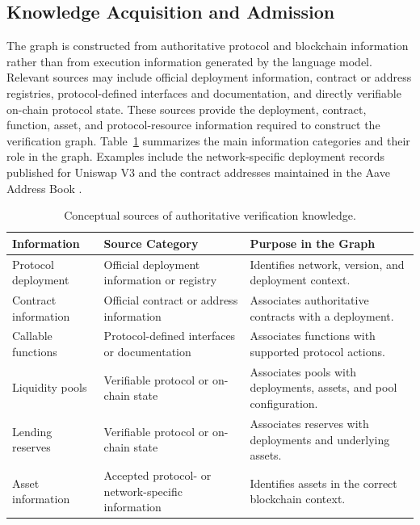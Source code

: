 \subsection{Knowledge Acquisition and Admission}

The graph is constructed from authoritative protocol and blockchain information
rather than from execution information generated by the language model.
Relevant sources may include official deployment information, contract or
address registries, protocol-defined interfaces and documentation, and directly
verifiable on-chain protocol state. These sources provide the deployment, contract, function, asset, and
protocol-resource information required to construct the verification graph.
Table~\ref{tab:verification_sources} summarizes the main information categories
and their role in the graph. Examples include the network-specific deployment records published for Uniswap V3 and the contract addresses maintained in the Aave Address Book \cite{UniswapV3Deployments,AaveAddressBook}.

\begin{table}[H]
\centering
\caption{Conceptual sources of authoritative verification knowledge.}
\label{tab:verification_sources}
\small
\begin{tabular}{p{} p{} p{}}
\hline
\textbf{Information} &
\textbf{Source Category} &
\textbf{Purpose in the Graph} \\
\hline

Protocol deployment &
Official deployment information or registry &
Identifies network, version, and deployment context. \\

Contract information &
Official contract or address information &
Associates authoritative contracts with a deployment. \\

Callable functions &
Protocol-defined interfaces or documentation &
Associates functions with supported protocol actions. \\

Liquidity pools &
Verifiable protocol or on-chain state &
Associates pools with deployments, assets, and pool configuration. \\

Lending reserves &
Verifiable protocol or on-chain state &
Associates reserves with deployments and underlying assets. \\

Asset information &
Accepted protocol- or network-specific information &
Identifies assets in the correct blockchain context. \\

\hline
\end{tabular}
\end{table}

